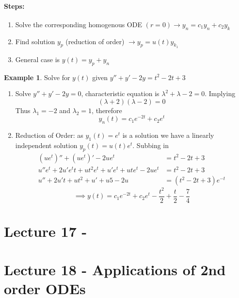 \documentclass[a6paper]{article}
\theoremstyle{definition}
\newtheorem{example}{Example}
\theoremstyle{plain}
\theoremstyle{remark}
\begin{document}
\paragraph{Steps:}
\begin{enumerate}
  \item Solve the corresponding homogenous ODE $ (r=0) \to y_n = c_1 y_n + c_2
    y_k $
  \item Find solution $ y_p $ (reduction of order) $ \to y_p = u(t)y_{k_1} $
  \item General case is $ y(t) = y_p + y_n $
\end{enumerate}
\begin{example}
  Solve for $ y(t) $ given $ y'' + y' - 2y = t^2 - 2t + 3 $
  \begin{enumerate}
    \item Solve $ y'' + y' - 2y = 0 $, characteristic equation is $ \lambda ^2
      + \lambda - 2 = 0$. Implying
      $$ (\lambda+2) (\lambda - 2) = 0 $$
      Thus $ \lambda_1 = -2 $ and $ \lambda _2 = 1 $, therefore
      $$ y_n (t) = c_1 e^{-2t} + c_2 e^t $$
    \item Reduction of Order: as $ y_1(t) = e^t $ is a solution we have
      a linearly independent solution $ y_p(t) = u(t)e^t $. Subbing in 
      \begin{align*}
	(ue^t)'' + (ue^t)' - 2ue^t &= t^2 - 2t + 3\\
	u''e^t + 2u'e^t t + ut^2 e^t + u' e^t + ute^t - 2ue^t &= t^2 - 2t
	+ 3 \\
	u'' + 2u't + ut^2 + u' + u5 - 2u &= (t^2 - 2t + 3)e^{-t}
      \end{align*}
      $$ \implies y(t) = c_1 e^{-2t} + c_2 e^t - \frac{t^2}{2} + \frac{t}{2}
      - \frac{7}{4} $$
  \end{enumerate}
\end{example}

\section{Lecture 17 - }

\section{Lecture 18 - Applications of 2nd order ODEs}
\end{document}
